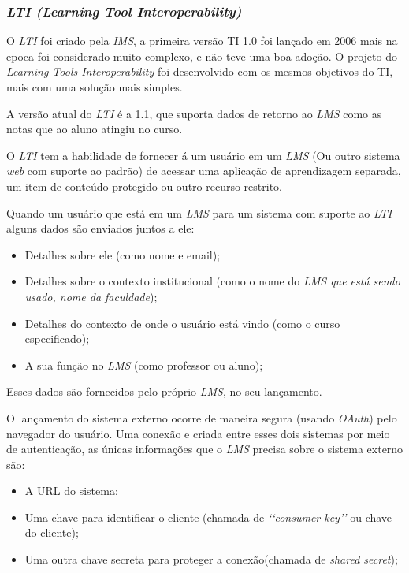 \subsubsection{\textit{LTI (Learning Tool Interoperability)}}
O \textit{LTI} foi criado pela \textit{IMS}, a primeira versão TI 1.0 foi lançado em 2006 mais na epoca foi considerado muito complexo, e não teve uma boa adoção. O projeto do \textit{Learning Tools Interoperability} foi desenvolvido com os mesmos objetivos do TI, mais com uma solução mais simples. \cite{ims}
\par
A versão atual do \textit{LTI} é a 1.1, que suporta dados de retorno ao \textit{LMS} como as notas que ao aluno atingiu no curso.
\par
\begin{citacao}
  O \textit{LTI} tem a habilidade de fornecer á um usuário em um \textit{LMS} (Ou outro sistema \textit{web} com suporte ao padrão) de acessar uma aplicação de aprendizagem separada, um item de conteúdo protegido ou outro recurso restrito. \cite[p.~2, tradução nossa]{vickers-ims}
\end{citacao}
\par
Quando um usuário que está em um \textit{LMS} para um sistema com suporte ao \textit{LTI} alguns dados são enviados juntos a ele:
\begin{itemize}
    \item Detalhes sobre ele (como nome e email);
    \item Detalhes sobre o contexto institucional (como o nome do \textit{LMS que está sendo usado, nome da faculdade});
    \item Detalhes do contexto de onde o usuário está vindo (como o curso especificado);
    \item A sua função no \textit{LMS} (como professor ou aluno);
\end{itemize}
Esses dados são fornecidos pelo próprio \textit{LMS}, no seu lançamento.
\par
O lançamento do sistema externo ocorre de maneira segura (usando \textit{OAuth}) pelo navegador do usuário. Uma conexão e criada entre esses dois sistemas por meio de autenticação, as únicas informações que o \textit{LMS} precisa sobre o sistema externo são:
\begin{itemize}
    \item A \ac{URL} do sistema;
    \item Uma chave para identificar o cliente (chamada de \textit{\lq\lq consumer key\rq\rq} ou chave do cliente);
    \item Uma outra chave secreta para proteger a conexão(chamada de \textit{shared secret});
\end{itemize}
